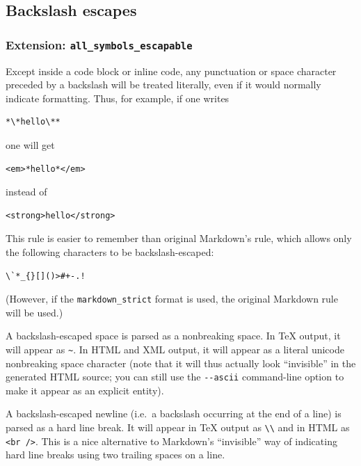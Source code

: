 \documentclass[
]{article}
\begin{document}
\hypertarget{backslash-escapes}{%
\subsection{Backslash escapes}\label{backslash-escapes}}

\hypertarget{extension-all_symbols_escapable}{%
\subsubsection{\texorpdfstring{Extension:
\texttt{all\_symbols\_escapable}}{Extension: all\_symbols\_escapable}}\label{extension-all_symbols_escapable}}

Except inside a code block or inline code, any punctuation or space
character preceded by a backslash will be treated literally, even if it
would normally indicate formatting. Thus, for example, if one writes

\begin{verbatim}
*\*hello\**
\end{verbatim}

one will get

\begin{verbatim}
<em>*hello*</em>
\end{verbatim}

instead of

\begin{verbatim}
<strong>hello</strong>
\end{verbatim}

This rule is easier to remember than original Markdown's rule, which
allows only the following characters to be backslash-escaped:

\begin{verbatim}
\`*_{}[]()>#+-.!
\end{verbatim}

(However, if the \texttt{markdown\_strict} format is used, the original
Markdown rule will be used.)

A backslash-escaped space is parsed as a nonbreaking space. In TeX
output, it will appear as \texttt{\textasciitilde{}}. In HTML and XML
output, it will appear as a literal unicode nonbreaking space character
(note that it will thus actually look ``invisible'' in the generated
HTML source; you can still use the \texttt{-\/-ascii} command-line
option to make it appear as an explicit entity).

A backslash-escaped newline (i.e.~a backslash occurring at the end of a
line) is parsed as a hard line break. It will appear in TeX output as
\texttt{\textbackslash{}\textbackslash{}} and in HTML as
\texttt{\textless{}br\ /\textgreater{}}. This is a nice alternative to
Markdown's ``invisible'' way of indicating hard line breaks using two
trailing spaces on a line.
\end{document}
